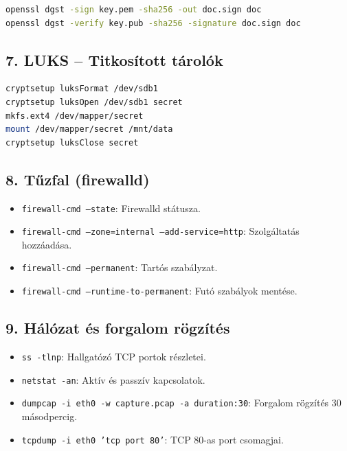 \documentclass[12pt,a4paper]{article}
\begin{document}
\begin{lstlisting}[language=bash,caption={Aláírás és ellenőrzés}]
openssl dgst -sign key.pem -sha256 -out doc.sign doc
openssl dgst -verify key.pub -sha256 -signature doc.sign doc
\end{lstlisting}

\subsection{7. LUKS – Titkosított tárolók}

\begin{lstlisting}[language=bash,caption={LUKS beállítás}]
cryptsetup luksFormat /dev/sdb1
cryptsetup luksOpen /dev/sdb1 secret
mkfs.ext4 /dev/mapper/secret
mount /dev/mapper/secret /mnt/data
cryptsetup luksClose secret
\end{lstlisting}

\subsection{8. Tűzfal (firewalld)}

\begin{itemize}
  \item \texttt{firewall-cmd --state}: Firewalld státusza.
  \item \texttt{firewall-cmd --zone=internal --add-service=http}: Szolgáltatás hozzáadása.
  \item \texttt{firewall-cmd --permanent}: Tartós szabályzat.
  \item \texttt{firewall-cmd --runtime-to-permanent}: Futó szabályok mentése.
\end{itemize}

\subsection{9. Hálózat és forgalom rögzítés}

\begin{itemize}
  \item \texttt{ss -tlnp}: Hallgatózó TCP portok részletei.
  \item \texttt{netstat -an}: Aktív és passzív kapcsolatok.
  \item \texttt{dumpcap -i eth0 -w capture.pcap -a duration:30}: Forgalom rögzítés 30 másodpercig.
  \item \texttt{tcpdump -i eth0 'tcp port 80'}: TCP 80-as port csomagjai.
\end{itemize}
\end{document}
